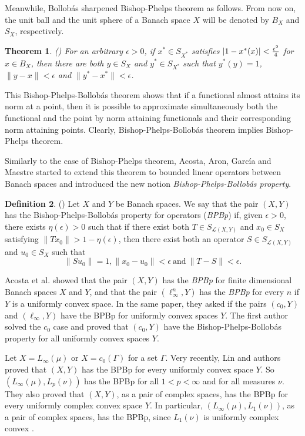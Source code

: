 \documentclass[a4paper]{amsart}
\theoremstyle{plain}
\newtheorem{theorem}{Theorem}[section]
\theoremstyle{definition}
\newtheorem{definition}[theorem]{Definition}
\begin{document}
Meanwhile, Bollob\'as sharpened Bishop-Phelps theorem as follows. From now on, the unit ball and the unit sphere of a Banach space $X$ will be denoted by $B_X$ and $S_X$, respectively.

\begin{theorem}(\cite{Bol})
For an arbitrary $\epsilon>0$, if $x^*\in S_{X^*}$ satisfies $|1-x^*(x)|<{{\epsilon^2}\over{4}}$ for $x\in B_X$, then there are both $y\in S_X$ and $y^*\in S_{X^*}$ such that $y^*(y)=1$, $\|y-x\|<\epsilon$ and $\|y^*-x^*\|<\epsilon$.
\end{theorem}

 This Bishop-Phelps-Bollob\'as theorem shows that if a functional almost attains its norm at a point, then it is possible to approximate simultaneously both the functional and the point by norm attaining functionals and their corresponding norm attaining points. Clearly, Bishop-Phelps-Bollob\'as theorem implies Bishop-Phelps theorem.

 Similarly to the case of Bishop-Phelps theorem, Acosta, Aron, Garc\'ia and Maestre \cite{AAGM2} started to extend this theorem to bounded linear operators between Banach spaces and introduced the new notion  \emph{Bishop-Phelps-Bollob\'as property}.

\begin{definition} (\cite[Definition 1.1]{AAGM2}) Let $X$ and $Y$ be Banach spaces. We say that the pair $(X, Y)$ has the Bishop-Phelps-Bollob\'as property for operators (\emph{BPBp}) if, given $\epsilon >0$,  there exists $\eta(\epsilon)>0$  such that if there exist both $T\in S_{\mathcal{L}(X,Y)}$ and $x_0 \in S_X$ satisfying $\|Tx_0\|>1-\eta (\epsilon)$, then there exist both an operator $S\in S_{\mathcal{L}(X,Y)}$ and $u_0\in S_X$ such that
$$\|Su_0\|=1, \|x_0 - u_0\|<\epsilon ~\mbox{and}~ \|T-S\|<\epsilon.$$
\end{definition}

 Acosta et al. showed \cite{AAGM2} that the pair $(X,Y)$ has the \emph{BPBp} for finite dimensional Banach spaces $X$ and $Y$, and that the pair $(\ell_{\infty}^n, Y)$ has the \emph{BPBp} for every $n$ if $Y$ is a uniformly convex space.  In the same paper, they asked if the pairs $(c_0, Y)$ and $(\ell_\infty, Y)$ have the BPBp for uniformly convex spaces $Y$. The first author solved the $c_0$ case and proved  \cite{Kim} that  $(c_0, Y)$ have the Bishop-Phelps-Bollob\'as property for all uniformly convex spaces $Y$.

Let $X=L_\infty(\mu)$ or $X=c_0(\Gamma)$ for a set $\Gamma$. Very recently, Lin and authors \cite{Lin} proved that $(X, Y)$ has the BPBp for every uniformly convex space $Y$. So $(L_\infty(\mu), L_p(\nu))$ has the BPBp for all $1<p<\infty$ and for all measures $\nu$. They also proved that $(X, Y)$, as a pair of complex spaces, has the BPBp for every uniformly complex convex space $Y$. In particular, $(L_\infty(\mu), L_1(\nu))$, as a pair of complex spaces, has the BPBp, since $L_1(\nu)$ is uniformly complex convex \cite{Glo}.  
\end{document}
